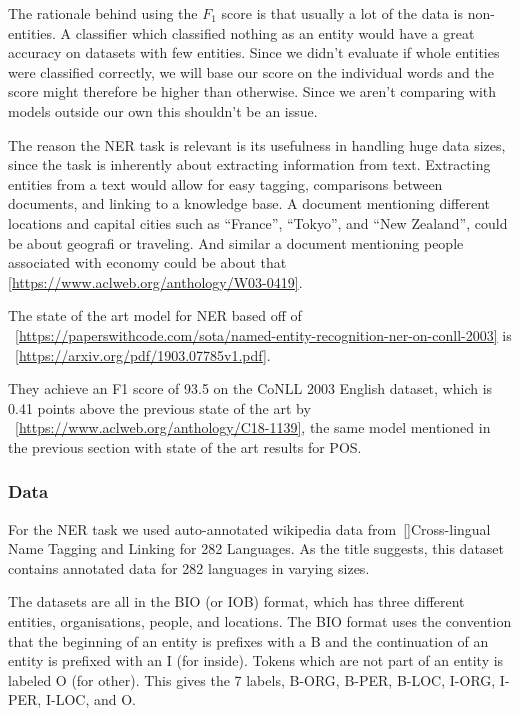 The rationale behind using the $F_1$ score is that usually a lot of the data is
non-entities. A classifier which classified nothing as an entity would have a
great accuracy on datasets with few entities. Since we didn't evaluate if whole
entities were classified correctly, we will base our score on the individual
words and the score might therefore be higher than otherwise. Since we aren't
comparing with models outside our own this shouldn't be an issue.

The reason the NER task is relevant is its usefulness in handling huge data
sizes, since the task is inherently about extracting information from text.
Extracting entities from a text would allow for easy tagging, comparisons
between documents, and linking to a knowledge base. A document mentioning
different locations and capital cities such as ``France'', ``Tokyo'', and ``New
Zealand'', could be about geografi or traveling. And similar a document
mentioning people associated with economy could be about that
\ref{https://www.aclweb.org/anthology/W03-0419}. 

The state of the art model for NER based off of
~\ref{https://paperswithcode.com/sota/named-entity-recognition-ner-on-conll-2003}
is ~\ref{https://arxiv.org/pdf/1903.07785v1.pdf}.


They achieve an F1 score of 93.5 on the CoNLL 2003 English dataset, which is
0.41 points above the previous state of the art by
~\ref{https://www.aclweb.org/anthology/C18-1139}, the same model mentioned in
the previous section with state of the art results for POS.

\subsubsection{Data}\label{sec:experiments-ner-data}

For the NER task we used auto-annotated wikipedia data from~\ref{}{Cross-lingual
Name Tagging and Linking for 282 Languages}. As the title suggests, this dataset
contains annotated data for 282 languages in varying sizes. 

The datasets are all in the BIO (or IOB) format, which has three different
entities, organisations, people, and locations. The BIO format uses the
convention that the beginning of an entity is prefixes with a B and the
continuation of an entity is prefixed with an I (for inside). Tokens which are
not part of an entity is labeled O (for other). This gives the 7 labels, B-ORG,
B-PER, B-LOC, I-ORG, I-PER, I-LOC, and O. 

